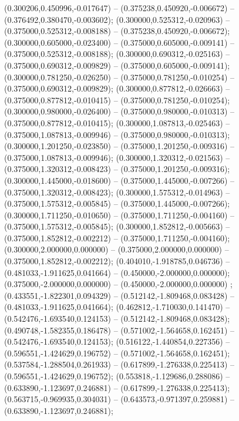  (0.300206,0.450996,-0.017647) -- (0.375238,0.450920,-0.006672) -- (0.376492,0.380470,-0.003602);
 (0.300000,0.525312,-0.020963) -- (0.375000,0.525312,-0.008188) -- (0.375238,0.450920,-0.006672);
 (0.300000,0.605000,-0.023400) -- (0.375000,0.605000,-0.009141) -- (0.375000,0.525312,-0.008188);
 (0.300000,0.690312,-0.025163) -- (0.375000,0.690312,-0.009829) -- (0.375000,0.605000,-0.009141);
 (0.300000,0.781250,-0.026250) -- (0.375000,0.781250,-0.010254) -- (0.375000,0.690312,-0.009829);
 (0.300000,0.877812,-0.026663) -- (0.375000,0.877812,-0.010415) -- (0.375000,0.781250,-0.010254);
 (0.300000,0.980000,-0.026400) -- (0.375000,0.980000,-0.010313) -- (0.375000,0.877812,-0.010415);
 (0.300000,1.087813,-0.025463) -- (0.375000,1.087813,-0.009946) -- (0.375000,0.980000,-0.010313);
 (0.300000,1.201250,-0.023850) -- (0.375000,1.201250,-0.009316) -- (0.375000,1.087813,-0.009946);
 (0.300000,1.320312,-0.021563) -- (0.375000,1.320312,-0.008423) -- (0.375000,1.201250,-0.009316);
 (0.300000,1.445000,-0.018600) -- (0.375000,1.445000,-0.007266) -- (0.375000,1.320312,-0.008423);
 (0.300000,1.575312,-0.014963) -- (0.375000,1.575312,-0.005845) -- (0.375000,1.445000,-0.007266);
 (0.300000,1.711250,-0.010650) -- (0.375000,1.711250,-0.004160) -- (0.375000,1.575312,-0.005845);
 (0.300000,1.852812,-0.005663) -- (0.375000,1.852812,-0.002212) -- (0.375000,1.711250,-0.004160);
 (0.300000,2.000000,0.000000) -- (0.375000,2.000000,0.000000) -- (0.375000,1.852812,-0.002212);
 (0.404010,-1.918785,0.046736) -- (0.481033,-1.911625,0.041664) -- (0.450000,-2.000000,0.000000);
 (0.375000,-2.000000,0.000000) -- (0.450000,-2.000000,0.000000) ;
 (0.433551,-1.822301,0.094329) -- (0.512142,-1.809468,0.083428) -- (0.481033,-1.911625,0.041664);
 (0.462812,-1.710030,0.141470) -- (0.542476,-1.693540,0.124153) -- (0.512142,-1.809468,0.083428);
 (0.490748,-1.582355,0.186478) -- (0.571002,-1.564658,0.162451) -- (0.542476,-1.693540,0.124153);
 (0.516122,-1.440854,0.227356) -- (0.596551,-1.424629,0.196752) -- (0.571002,-1.564658,0.162451);
 (0.537584,-1.288504,0.261933) -- (0.617899,-1.276338,0.225413) -- (0.596551,-1.424629,0.196752);
 (0.553818,-1.129686,0.288086) -- (0.633890,-1.123697,0.246881) -- (0.617899,-1.276338,0.225413);
 (0.563715,-0.969935,0.304031) -- (0.643573,-0.971397,0.259881) -- (0.633890,-1.123697,0.246881);
